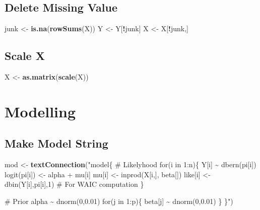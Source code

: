 \documentclass[
]{article}
\newenvironment{Shaded}{\begin{snugshade}}{\end{snugshade}}
\newcommand{\FunctionTok}[1]{\textcolor[rgb]{0.13,0.29,0.53}{\textbf{#1}}}
\newcommand{\NormalTok}[1]{#1}
\newcommand{\OtherTok}[1]{\textcolor[rgb]{0.56,0.35,0.01}{#1}}
\newcommand{\SpecialCharTok}[1]{\textcolor[rgb]{0.81,0.36,0.00}{\textbf{#1}}}
\newcommand{\StringTok}[1]{\textcolor[rgb]{0.31,0.60,0.02}{#1}}
\begin{document}
\subsection{Delete Missing Value}\label{delete-missing-value}

\begin{Shaded}
\begin{Highlighting}[]
\NormalTok{junk }\OtherTok{\textless{}{-}} \FunctionTok{is.na}\NormalTok{(}\FunctionTok{rowSums}\NormalTok{(X))}
\NormalTok{Y }\OtherTok{\textless{}{-}}\NormalTok{ Y[}\SpecialCharTok{!}\NormalTok{junk]}
\NormalTok{X }\OtherTok{\textless{}{-}}\NormalTok{ X[}\SpecialCharTok{!}\NormalTok{junk,]}
\end{Highlighting}
\end{Shaded}

\subsection{Scale X}\label{scale-x}

\begin{Shaded}
\begin{Highlighting}[]
\NormalTok{X }\OtherTok{\textless{}{-}} \FunctionTok{as.matrix}\NormalTok{(}\FunctionTok{scale}\NormalTok{(X))}
\end{Highlighting}
\end{Shaded}

\section{Modelling}\label{modelling}

\subsection{Make Model String}\label{make-model-string}

\begin{Shaded}
\begin{Highlighting}[]
\NormalTok{mod }\OtherTok{\textless{}{-}} \FunctionTok{textConnection}\NormalTok{(}\StringTok{"model\{}
\StringTok{\# Likelyhood}
\StringTok{for(i in 1:n)\{}
\StringTok{  Y[i] \textasciitilde{} dbern(pi[i])}
\StringTok{  logit(pi[i]) \textless{}{-} alpha + mu[i]}
\StringTok{  mu[i] \textless{}{-} inprod(X[i,], beta[])}
\StringTok{  like[i] \textless{}{-} dbin(Y[i],pi[i],1) \# For WAIC computation}
\StringTok{  \}}

\StringTok{\# Prior}
\StringTok{alpha \textasciitilde{} dnorm(0,0.01)}
\StringTok{for(j in 1:p)\{}
\StringTok{  beta[j] \textasciitilde{} dnorm(0,0.01)}
\StringTok{\}}
\StringTok{\}"}\NormalTok{)}
\end{Highlighting}
\end{Shaded}
\end{document}
